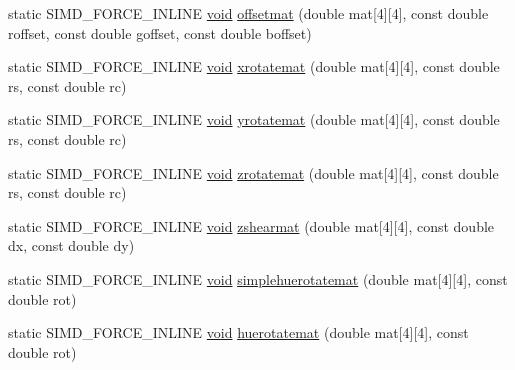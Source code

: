 \begin{DoxyCompactItemize}
\item 
static S\+I\+M\+D\+\_\+\+F\+O\+R\+C\+E\+\_\+\+I\+N\+L\+I\+NE \mbox{\hyperlink{_thread_8h_af1e856da2e658414cb2456cb6f7ebc66}{void}} \mbox{\hyperlink{classnjli_1_1_color_util_a41a9d5c0daa4ab6c0bf04aa9c66ea6d2}{offsetmat}} (double mat\mbox{[}4\mbox{]}\mbox{[}4\mbox{]}, const double roffset, const double goffset, const double boffset)
\item 
static S\+I\+M\+D\+\_\+\+F\+O\+R\+C\+E\+\_\+\+I\+N\+L\+I\+NE \mbox{\hyperlink{_thread_8h_af1e856da2e658414cb2456cb6f7ebc66}{void}} \mbox{\hyperlink{classnjli_1_1_color_util_aa2f35809a653366ba6cfc11a34227af0}{xrotatemat}} (double mat\mbox{[}4\mbox{]}\mbox{[}4\mbox{]}, const double rs, const double rc)
\item 
static S\+I\+M\+D\+\_\+\+F\+O\+R\+C\+E\+\_\+\+I\+N\+L\+I\+NE \mbox{\hyperlink{_thread_8h_af1e856da2e658414cb2456cb6f7ebc66}{void}} \mbox{\hyperlink{classnjli_1_1_color_util_ac37c7eb0af14d9171809c8a1cab9a834}{yrotatemat}} (double mat\mbox{[}4\mbox{]}\mbox{[}4\mbox{]}, const double rs, const double rc)
\item 
static S\+I\+M\+D\+\_\+\+F\+O\+R\+C\+E\+\_\+\+I\+N\+L\+I\+NE \mbox{\hyperlink{_thread_8h_af1e856da2e658414cb2456cb6f7ebc66}{void}} \mbox{\hyperlink{classnjli_1_1_color_util_ab43ec520ddd37266b3fb9a2e4f4a4ec3}{zrotatemat}} (double mat\mbox{[}4\mbox{]}\mbox{[}4\mbox{]}, const double rs, const double rc)
\item 
static S\+I\+M\+D\+\_\+\+F\+O\+R\+C\+E\+\_\+\+I\+N\+L\+I\+NE \mbox{\hyperlink{_thread_8h_af1e856da2e658414cb2456cb6f7ebc66}{void}} \mbox{\hyperlink{classnjli_1_1_color_util_a97183f17df4c96e96351e96c94fc587a}{zshearmat}} (double mat\mbox{[}4\mbox{]}\mbox{[}4\mbox{]}, const double dx, const double dy)
\item 
static S\+I\+M\+D\+\_\+\+F\+O\+R\+C\+E\+\_\+\+I\+N\+L\+I\+NE \mbox{\hyperlink{_thread_8h_af1e856da2e658414cb2456cb6f7ebc66}{void}} \mbox{\hyperlink{classnjli_1_1_color_util_ad8878d29f6f4f7cc09cad4a0decd18cf}{simplehuerotatemat}} (double mat\mbox{[}4\mbox{]}\mbox{[}4\mbox{]}, const double rot)
\item 
static S\+I\+M\+D\+\_\+\+F\+O\+R\+C\+E\+\_\+\+I\+N\+L\+I\+NE \mbox{\hyperlink{_thread_8h_af1e856da2e658414cb2456cb6f7ebc66}{void}} \mbox{\hyperlink{classnjli_1_1_color_util_ac05958efe06cd5958961a0f79da8f1eb}{huerotatemat}} (double mat\mbox{[}4\mbox{]}\mbox{[}4\mbox{]}, const double rot)
\end{DoxyCompactItemize}
